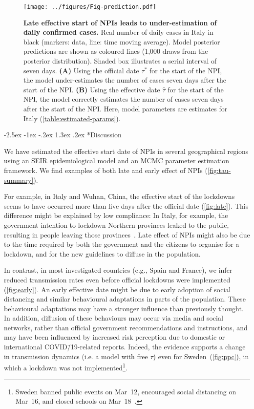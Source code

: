 \documentclass[12pt]{extarticle}
\makeatletter
\renewcommand\section{\@startsection {section}{1}{\z@}%
     {-2.5ex \@plus -1ex \@minus -.2ex}%
     {1.3ex \@plus.2ex}%
    {\Large\bfseries}}
\makeatother
\begin{document}
\begin{figure}[h]
    \centering
	\texttt{[image: ../figures/Fig-prediction.pdf]}
    \caption{
    \textbf{Late effective start of NPIs leads to under-estimation of daily confirmed cases.}
    Real number of daily cases in Italy in black (markers: data, line: time moving average). 
    Model posterior predictions are shown as coloured lines (1,000 draws from the posterior distribution). 
    Shaded box illustrates a serial interval of seven days.
    \textbf{(A)} Using the official date $\tau^*$ for the start of the NPI,  the model under-estimates the number of cases seven days after the start of the NPI.
    \textbf{(B)} Using the effective date $\hat{\tau}$ for the start of the NPI,  the model correctly estimates the number of cases seven days after the start of the NPI.
    Here, model parameters are estimates for Italy (\autoref{table:estimated-params}).
    } 
    \label{fig:prediction}
\end{figure}



\pagebreak
\section*{Discussion}

We have estimated the effective start date of NPIs in several geographical regions using an SEIR epidemiological model and an MCMC parameter estimation framework.
We find examples of both late and early effect of NPIs (\autoref{fig:tau-summary}).

For example, in Italy and Wuhan, China, the effective start of the lockdowns seems to have occurred more than five days after the official date (\autoref{fig:late}).
This difference might be explained by low compliance: In Italy, for example, the government intention to lockdown Northern provinces leaked to the public, resulting in people leaving those provinces~\citep{Gatto2020}.
Late effect of NPIs might also be due to the time required by both the government and the citizens to organise for a lockdown, and for the new guidelines to diffuse in the population.
 
In contrast, in most investigated countries (e.g., Spain and France), we infer reduced transmission rates even before official lockdowns were implemented (\autoref{fig:early}).
An early effective date might be due to early adoption of social distancing and similar behavioural adaptations in parts of the population. These behavioural adaptations may have a stronger influence than previously thought. In addition, diffusion of these behaviours may occur via media and social networks, rather than official government recommendations and instructions, and may have been influenced by increased risk perception due to domestic or international COVID\=/19-related reports.
Indeed, the evidence supports a change in transmission dynamics (i.e. a model with free $\tau$) even for Sweden~(\autoref{fig:ppc}), in which a lockdown was not implemented\footnote{Sweden banned public events on Mar~12, encouraged social distancing on Mar~16, and closed schools on Mar~18~\citep{Flaxman2020}.}.
\end{document}
